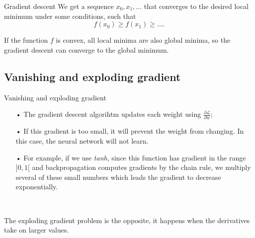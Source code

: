 \documentclass[11pt]{beamer}
\begin{document}
\begin{frame}{Gradient descent}
We get a sequence $x_0,x_1,\dots$ that converges to the desired local minimum under some conditions, such that
$$
f(x_0) \geq f(x_1) \geq \dots . 
$$

If the function $f$ is convex, all local minima are also global minima, so the gradient descent can converge to the global minimum.
\end{frame}

\subsection{Vanishing and exploding gradient}
\begin{frame}{Vanishing and exploding gradient}
\begin{itemize}
\item[•] The gradient descent algorihtm updates each weight using $\frac{\partial \mathcal{L}}{\partial w}$;
\item[•] If this gradient is too small, it will prevent the weight from changing. In this case, the neural network will not learn.
\item[•] For example, if we use \textit{tanh}, since this function has gradient in the range $]0,1[$ and backpropagation computes gradients by the chain rule, we multiply several of these small numbers which leads the gradient to decrease exponentially.
\end{itemize}

~

The exploding gradient problem is the opposite, it happens when the derivatives take on larger values.

\end{frame}
\end{document}
